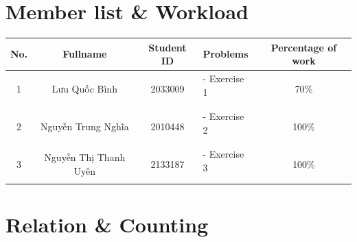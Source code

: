 \documentclass[a4paper]{article}
\begin{document}
    \section{Member list \& Workload}

    \begin{center}
        \begin{tabular}{|c|c|c|l|c|}
            \hline
            \textbf{No.}       & \textbf{Fullname}                      & \textbf{Student ID}       & \textbf{Problems}                 & \textbf{Percentage of work} \\
            \hline
            \multirow{3}{*}{1} & \multirow{3}{*}{Lưu Quốc Bình} & \multirow{3}{*}{2033009}  & - Exercise 1 & \multirow{3}{*}{70\%}\\
            &                                &                           & &                             \\
            &                                &                           & &                             \\
            \hline
            \multirow{3}{*}{2} & \multirow{3}{*}{Nguyễn Trung Nghĩa}  & \multirow{3}{*}{2010448} &- Exercise 2 & \multirow{3}{*}{100\%}\\
            &                                &                           & &                             \\
            &                                &                           & &                             \\
            \hline
            \multirow{3}{*}{3} & \multirow{3}{*}{Nguyễn Thị Thanh Uyên}       & \multirow{3}{*}{2133187} &- Exercise 3 & \multirow{3}{*}{100\%}\\
            &                                &                           & &                             \\
            &                                &                           & &                             \\
            \hline
        \end{tabular}
    \end{center}



    \section{Relation \& Counting}
\end{document}
